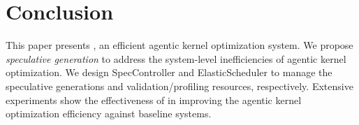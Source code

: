 \section{Conclusion}\label{sec:conc}

This paper presents \sysname{}, an efficient agentic kernel optimization system. 
We propose \emph{speculative generation} to address the system-level inefficiencies
of agentic kernel optimization. We design SpecController and ElasticScheduler to manage
the speculative generations and validation/profiling resources, respectively.
Extensive experiments show the effectiveness of \sysname{} in improving the 
agentic kernel optimization efficiency against baseline systems.